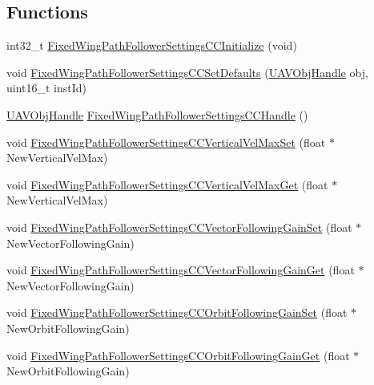 \subsection*{\-Functions}
\begin{DoxyCompactItemize}
\item 
int32\-\_\-t \hyperlink{group___fixed_wing_path_follower_settings_c_c_ga153d91b4156f9f94e008cbfde7889344}{\-Fixed\-Wing\-Path\-Follower\-Settings\-C\-C\-Initialize} (void)
\item 
void \hyperlink{group___fixed_wing_path_follower_settings_c_c_gac8649a5212dc7b593b2e409dea9116a0}{\-Fixed\-Wing\-Path\-Follower\-Settings\-C\-C\-Set\-Defaults} (\hyperlink{targets_2_u_a_v_objects_2inc_2uavobjectmanager_8h_a279053e22be53ce9f895043aaeb91e3b}{\-U\-A\-V\-Obj\-Handle} obj, uint16\-\_\-t inst\-Id)
\item 
\hyperlink{targets_2_u_a_v_objects_2inc_2uavobjectmanager_8h_a279053e22be53ce9f895043aaeb91e3b}{\-U\-A\-V\-Obj\-Handle} \hyperlink{group___fixed_wing_path_follower_settings_c_c_ga35dfdad07106a3f9dbd516781e3c77ba}{\-Fixed\-Wing\-Path\-Follower\-Settings\-C\-C\-Handle} ()
\item 
void \hyperlink{group___fixed_wing_path_follower_settings_c_c_ga683d7a8654dae5419e03ef9968cf4764}{\-Fixed\-Wing\-Path\-Follower\-Settings\-C\-C\-Vertical\-Vel\-Max\-Set} (float $\ast$\-New\-Vertical\-Vel\-Max)
\item 
void \hyperlink{group___fixed_wing_path_follower_settings_c_c_gacbb59fbb184ee7f9b3f1f3aba3249045}{\-Fixed\-Wing\-Path\-Follower\-Settings\-C\-C\-Vertical\-Vel\-Max\-Get} (float $\ast$\-New\-Vertical\-Vel\-Max)
\item 
void \hyperlink{group___fixed_wing_path_follower_settings_c_c_gaf97af0de203a8c96295c453cb1267880}{\-Fixed\-Wing\-Path\-Follower\-Settings\-C\-C\-Vector\-Following\-Gain\-Set} (float $\ast$\-New\-Vector\-Following\-Gain)
\item 
void \hyperlink{group___fixed_wing_path_follower_settings_c_c_gaece1f7253f60ce62d36852f555972dc3}{\-Fixed\-Wing\-Path\-Follower\-Settings\-C\-C\-Vector\-Following\-Gain\-Get} (float $\ast$\-New\-Vector\-Following\-Gain)
\item 
void \hyperlink{group___fixed_wing_path_follower_settings_c_c_ga121480c33f62d4582c2453ba53885c5c}{\-Fixed\-Wing\-Path\-Follower\-Settings\-C\-C\-Orbit\-Following\-Gain\-Set} (float $\ast$\-New\-Orbit\-Following\-Gain)
\item 
void \hyperlink{group___fixed_wing_path_follower_settings_c_c_ga9363688654c225da28493627b83937cc}{\-Fixed\-Wing\-Path\-Follower\-Settings\-C\-C\-Orbit\-Following\-Gain\-Get} (float $\ast$\-New\-Orbit\-Following\-Gain)

\end{DoxyCompactItemize}
